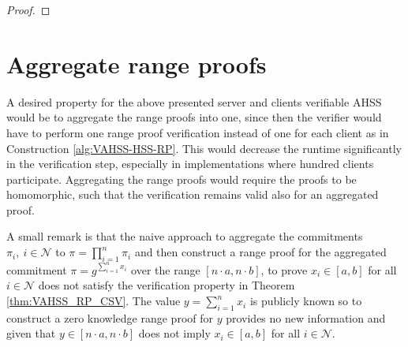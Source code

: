 \begin{proof}
\begin{comment}
The proof of security argument for malicious servers given in \cite{SumItUp} is still sufficient since the Pedersen commitment is perfectly hiding and computationally binding and that the range proofs are zero knowledge. The security argument for malicious clients follows from the soundness of the range proof and that the secret hidden in the commitment has to be the same as the secret in the shares, as argued above. . 

The proof of \textit{\textbf{Verifiability Severs}} is the same as the proof given in  in \cite{SumItUp}, except that the commitments $\pi_i$ replaces the checksums $\tau_i$.  \textit{\textbf{Verifiability Clients}} follows from the properties of the range proof.
\end{comment}
\end{proof}


\section{Aggregate range proofs}
\label{sec:aggregation}
A desired property for the above presented server and clients verifiable AHSS would be to aggregate the range proofs into one, since then the verifier would have to perform one range proof verification instead of one for each client as in Construction \ref{alg:VAHSS-HSS-RP}. This would decrease the runtime significantly in the verification step, especially in implementations where hundred clients participate. Aggregating the range proofs would require the proofs to be homomorphic, such that the verification remains valid also for an aggregated proof.

A small remark is that the naive approach to aggregate the commitments $\pi_i, \: i\in\mathcal{N}$ to $\pi = \prod_{i=1}^n \pi_i$ and then construct a range proof for the aggregated commitment $\pi = g^{\sum_{i=1}^n x_i}$ over the range $[n\cdot a,n\cdot b]$, to prove $x_i \in [a,b]$ for all $i \in\mathcal{N}$  does not satisfy the verification property in Theorem \ref{thm:VAHSS_RP_CSV}. The value $y=\sum_{i=1}^n x_i$ is publicly known so to construct a zero knowledge range proof for $y $ provides no new information and given that $y\in [n\cdot a,n\cdot b]$ does not imply $x_i\in [a,b]$ for all $i\in\mathcal{N}$. 

